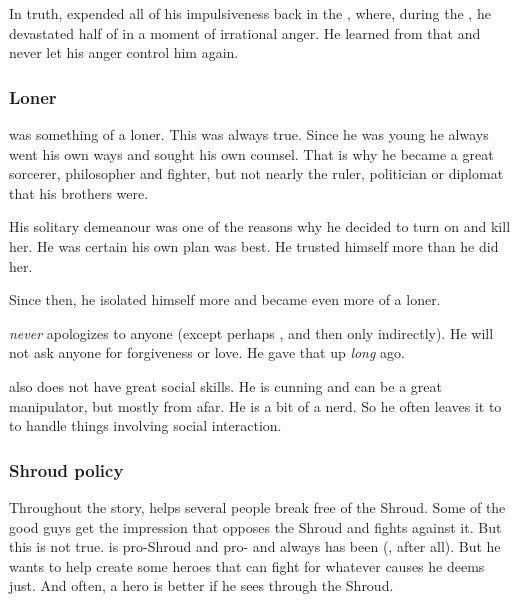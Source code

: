 In truth, \Ishnaruchaefir{} expended all of his impulsiveness back in the \secondbanewar, where, during the \SecondShrouding, he devastated half of \Miith{} in a moment of irrational anger. 
He learned from that and never let his anger control him again.





\subsubsection{Loner}
\Ishnaruchaefir{} was something of a loner. 
This was always true. 
Since he was young he always went his own ways and sought his own counsel. 
That is why he became a great sorcerer, philosopher and fighter, but not nearly the ruler, politician or diplomat that his brothers were. 

His solitary demeanour was one of the reasons why he decided to turn on \Triestessakhin{} and kill her. 
He was certain his own plan was best. 
He trusted himself more than he did her. 

Since then, he isolated himself more and became even more of a loner. 

\Ishnaruchaefir{} \emph{never} apologizes to anyone (except perhaps \Criseis, and then only indirectly). 
He will not ask anyone for forgiveness or love.
He gave that up \emph{long} ago. 

\Ishnaruchaefir{} also does not have great social skills. 
He is cunning and can be a great manipulator, but mostly from afar. 
He is a bit of a nerd. 
So he often leaves it to \Criseis{} to handle things involving social interaction. 





\subsubsection{Shroud policy}
Throughout the story, \Ishnaruchaefir{} helps several people break free of the Shroud. 
Some of the good guys get the impression that \Ishnaruchaefir{} opposes the Shroud and fights against it. 
But this is not true. 
\Ishnaruchaefir{} is pro-Shroud and pro- and always has been (, after all). 
But he wants to help create some heroes that can fight for whatever causes he deems just. 
And often, a hero is better if he sees through the Shroud. 





